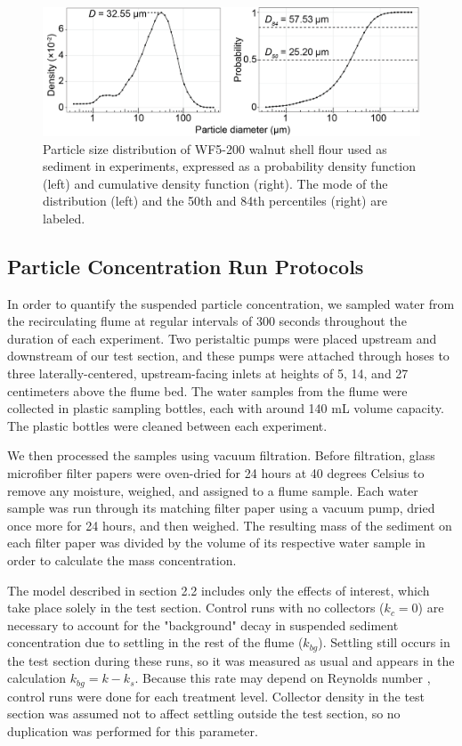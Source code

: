 \documentclass{scrreprt}
\begin{document}
\begin{figure}[htbp]
\includegraphics[width=15cm] {wf5-200sizedist.png}
\centering
\caption{Particle size distribution of WF5-200 walnut shell flour used as sediment in experiments, expressed as a probability density function (left) and cumulative density function (right). The mode of the distribution (left) and the 50th and 84th percentiles (right) are labeled.} 
\label{fig:sedsize}
\end{figure}

\subsection{Particle Concentration Run Protocols}

In order to quantify the suspended particle concentration, we sampled water from the recirculating flume at regular intervals of 300 seconds throughout the duration of each experiment. Two peristaltic pumps were placed upstream and downstream of our test section, and these pumps were attached through hoses to three laterally-centered, upstream-facing inlets at heights of 5, 14, and 27 centimeters above the flume bed. The water samples from the flume were collected in plastic sampling bottles, each with around 140 mL volume capacity. The plastic bottles were cleaned between each experiment. 

We then processed the samples using vacuum filtration. Before filtration, glass microfiber filter papers were oven-dried for 24 hours at 40 degrees Celsius to remove any moisture, weighed, and assigned to a flume sample. Each water sample was run through its matching filter paper using a vacuum pump, dried once more for 24 hours, and then weighed. The resulting mass of the sediment on each filter paper was divided by the volume of its respective water sample in order to calculate the mass concentration.

The model described in section 2.2 includes only the effects of interest, which take place solely in the test section. Control runs with no collectors ($k_c = 0$) are necessary to account for the "background" decay in suspended sediment concentration due to settling in the rest of the flume ($k_{bg}$). Settling still occurs in the test section during these runs, so it was measured as usual and appears in the calculation $k_{bg} = k - k_s$. Because this rate may depend on Reynolds number \citep{Nielsen_1993, Jacobs_2016, Wang_2018}, control runs were done for each treatment level. Collector density in the test section was assumed not to affect settling outside the test section, so no duplication was performed for this parameter.
\end{document}
